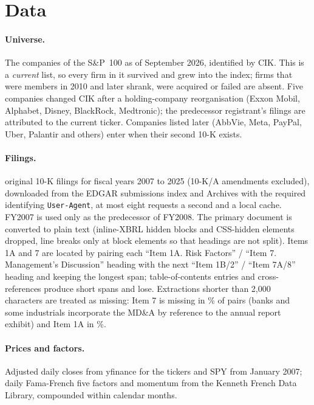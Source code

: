 \documentclass[11pt,a4paper]{article}
\begin{document}
\section{Data}\label{sec:data}

\paragraph{Universe.} The \nCompanies{} companies of the S\&P~100 as of September 2026, identified by CIK. This is a \emph{current} list, so every firm in it survived and grew into the index; firms that were members in 2010 and later shrank, were acquired or failed are absent. Five companies changed CIK after a holding-company reorganisation (Exxon Mobil, Alphabet, Disney, BlackRock, Medtronic); the predecessor registrant's filings are attributed to the current ticker. Companies listed later (AbbVie, Meta, PayPal, Uber, Palantir and others) enter when their second 10-K exists.

\paragraph{Filings.} \nFilings{} original 10-K filings for fiscal years 2007 to 2025 (10-K/A amendments excluded), downloaded from the EDGAR submissions index and Archives with the required identifying \texttt{User-Agent}, at most eight requests a second and a local cache. FY2007 is used only as the predecessor of FY2008. The primary document is converted to plain text (inline-XBRL hidden blocks and CSS-hidden elements dropped, line breaks only at block elements so that headings are not split). Items 1A and 7 are located by pairing each ``Item 1A. Risk Factors'' / ``Item 7. Management's Discussion'' heading with the next ``Item 1B/2'' / ``Item 7A/8'' heading and keeping the longest span; table-of-contents entries and cross-references produce short spans and lose. Extractions shorter than 2,000 characters are treated as missing: Item 7 is missing in \shareMissingVII\% of pairs (banks and some industrials incorporate the MD\&A by reference to the annual report exhibit) and Item 1A in \shareMissingIA\%.

\paragraph{Prices and factors.} Adjusted daily closes from yfinance for the \nCompanies{} tickers and SPY from January 2007; daily Fama-French five factors and momentum from the Kenneth French Data Library, compounded within calendar months.
\end{document}
